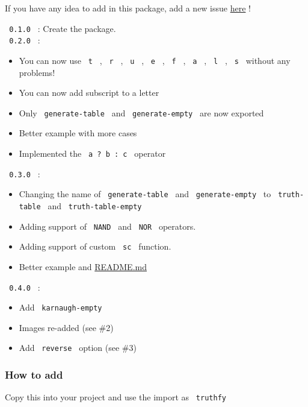 If you have any idea to add in this package, add a new issue
\href{https://github.com/Thumuss/truthfy/issues}{here} !

\texttt{\ 0.1.0\ } : Create the package.\\
\texttt{\ 0.2.0\ } :

\begin{itemize}
\tightlist
\item
  You can now use \texttt{\ t\ } , \texttt{\ r\ } , \texttt{\ u\ } ,
  \texttt{\ e\ } , \texttt{\ f\ } , \texttt{\ a\ } , \texttt{\ l\ } ,
  \texttt{\ s\ } without any problems!
\item
  You can now add subscript to a letter
\item
  Only \texttt{\ generate-table\ } and \texttt{\ generate-empty\ } are
  now exported
\item
  Better example with more cases
\item
  Implemented the \texttt{\ a\ ?\ b\ :\ c\ } operator\\
\end{itemize}

\texttt{\ 0.3.0\ } :

\begin{itemize}
\tightlist
\item
  Changing the name of \texttt{\ generate-table\ } and
  \texttt{\ generate-empty\ } to \texttt{\ truth-table\ } and
  \texttt{\ truth-table-empty\ }
\item
  Adding support of \texttt{\ NAND\ } and \texttt{\ NOR\ } operators.
\item
  Adding support of custom \texttt{\ sc\ } function.
\item
  Better example and \href{http://readme.md/}{README.md}
\end{itemize}

\texttt{\ 0.4.0\ } :

\begin{itemize}
\tightlist
\item
  Add \texttt{\ karnaugh-empty\ }
\item
  Images re-added (see \#2)
\item
  Add \texttt{\ reverse\ } option (see \#3)
\end{itemize}

\subsubsection{How to add}\label{how-to-add}

Copy this into your project and use the import as \texttt{\ truthfy\ }

